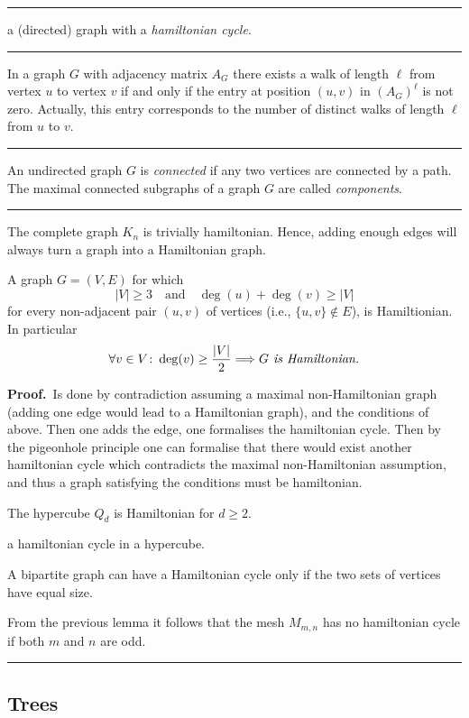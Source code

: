 \documentclass[a4paper]{extarticle}
\newcommand{\Proof}{\textbf{Proof.}\ }
\newcommand{\card}[1]{\lvert #1 \rvert}
\newcommand{\sep}{\vspace{5pt}\noindent\hrule\vspace{5pt}}
\begin{document}
\begin{multicols*}{2}
\sep

 a (directed) graph with a \emph{hamiltonian cycle}.

\sep

\Thm In a graph $G$ with adjacency matrix $A_G$ there exists a walk of length
$\ell$ from vertex $u$ to vertex $v$ if and only if the entry at position
$(u,v)$ in $(A_G)^{\ell}$ is not zero. Actually, this entry corresponds to the
number of distinct walks of length $\ell$ from $u$ to $v$.

\sep

 An undirected graph $G$ is \emph{connected} if any
two vertices are connected by a path. The maximal connected subgraphs of a graph
$G$ are called \emph{components}.

\sep

\Lem The complete graph $K_n$ is trivially hamiltonian. Hence, adding enough
edges will always turn a graph into a Hamiltonian graph.

\Thm A graph $G=(V,E)$ for which 
\[
\card{V}\geq 3
\quad \text{and}\quad
\deg(u)+\deg(v)\geq\card{V}
\]
for every non-adjacent pair $(u,v)$ of vertices
(i.e., $\{u,v\}\not\in E$), is Hamiltionian. In particular
\[
\forall v\in V\colon \deg(v)\geq\frac{\card{V}}{2} \Longrightarrow G \emph { is
Hamiltonian.} \]

\Proof Is done by contradiction assuming a maximal non-Hamiltonian graph
(adding one edge would lead to a Hamiltonian graph), and the conditions of
above. Then one adds the edge, one formalises the hamiltonian cycle. Then by the
pigeonhole principle one can formalise that there would exist another
hamiltonian cycle which contradicts the maximal non-Hamiltonian assumption, and
thus a graph satisfying the conditions must be hamiltonian.

\Thm The hypercube $Q_d$ is Hamiltonian for $d\geq 2$.

 a hamiltonian cycle in a hypercube.

\Lem A bipartite graph can have a Hamiltonian cycle only if the two sets of
vertices have equal size.

\Lem From the previous lemma it follows that the mesh $M_{m,n}$ has no
hamiltonian cycle if both $m$ and $n$ are odd.

\sep

\subsection{Trees}


\end{multicols*}
\end{document}
